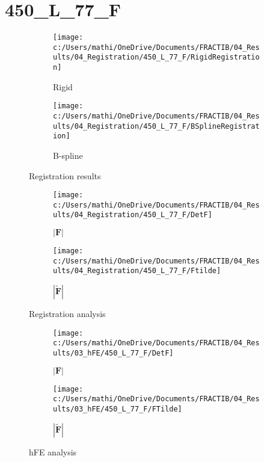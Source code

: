 \documentclass{article}%
\begin{document}
%
\newpage%
\section*{450\_L\_77\_F}%
\label{sec:450L77F}%


\begin{figure}[h!]%
\begin{subfigure}[b]{0.5\linewidth}%
\texttt{[image: c:/Users/mathi/OneDrive/Documents/FRACTIB/04\_Results/04\_Registration/450\_L\_77\_F/RigidRegistration]}%
\caption{Rigid}%
\end{subfigure}%
\begin{subfigure}[b]{0.5\linewidth}%
\texttt{[image: c:/Users/mathi/OneDrive/Documents/FRACTIB/04\_Results/04\_Registration/450\_L\_77\_F/BSplineRegistration]}%
\caption{B{-}spline}%
\end{subfigure}%
\caption{Registration results}%
\end{figure}

%


\begin{figure}[h!]%
\begin{subfigure}[b]{0.5\linewidth}%
\texttt{[image: c:/Users/mathi/OneDrive/Documents/FRACTIB/04\_Results/04\_Registration/450\_L\_77\_F/DetF]}%
\caption{$|\mathbf{F}|$}%
\end{subfigure}%
\begin{subfigure}[b]{0.5\linewidth}%
\texttt{[image: c:/Users/mathi/OneDrive/Documents/FRACTIB/04\_Results/04\_Registration/450\_L\_77\_F/Ftilde]}%
\caption{$|\widetilde{\mathbf{F}}|$}%
\end{subfigure}%
\caption{Registration analysis}%
\end{figure}

%


\begin{figure}[h!]%
\begin{subfigure}[b]{0.5\linewidth}%
\texttt{[image: c:/Users/mathi/OneDrive/Documents/FRACTIB/04\_Results/03\_hFE/450\_L\_77\_F/DetF]}%
\caption{$|\mathbf{F}|$}%
\end{subfigure}%
\begin{subfigure}[b]{0.5\linewidth}%
\texttt{[image: c:/Users/mathi/OneDrive/Documents/FRACTIB/04\_Results/03\_hFE/450\_L\_77\_F/FTilde]}%
\caption{$|\widetilde{\mathbf{F}}|$}%
\end{subfigure}%
\caption{hFE analysis}%
\end{figure}
\end{document}

